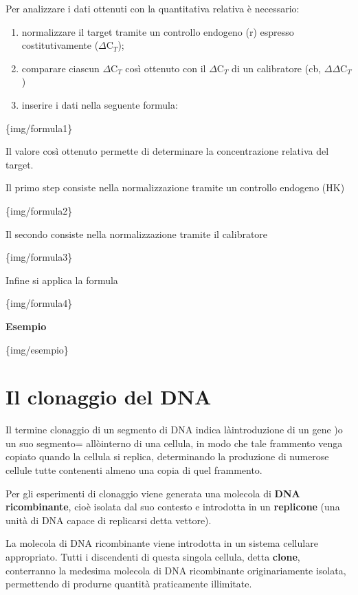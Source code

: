 \documentclass[11pt]{book}
\begin{document}
Per analizzare i dati ottenuti con la quantitativa relativa è
necessario:

\begin{enumerate}
\def\labelenumi{\arabic{enumi}.}
\itemsep1pt\parskip0pt
\item
  normalizzare il target tramite un controllo endogeno (r) espresso
  costitutivamente (\(\Delta\)C\(_T\));
\item
  comparare ciascun \(\Delta\)C\(_T\) così ottenuto con il
  \(\Delta\)C\(_T\) di un calibratore (cb, \(\Delta\)\(\Delta\)C\(_T\))
\item
  inserire i dati nella seguente formula:
\end{enumerate}

\{img/formula1\}

Il valore così ottenuto permette di determinare la concentrazione
relativa del target.

Il primo step consiste nella normalizzazione tramite un controllo
endogeno (HK)

\{img/formula2\}

Il secondo consiste nella normalizzazione tramite il calibratore

\{img/formula3\}

Infine si applica la formula

\{img/formula4\}

\textbf{Esempio}

\{img/esempio\}

\chapter{Il clonaggio del DNA}\label{il-clonaggio-del-dna}

Il termine clonaggio di un segmento di DNA indica làintroduzione di un
gene )o un suo segmento= allòinterno di una cellula, in modo che tale
frammento venga copiato quando la cellula si replica, determinando la
produzione di numerose cellule tutte contenenti almeno una copia di quel
frammento.

Per gli esperimenti di clonaggio viene generata una molecola di
\textbf{DNA ricombinante}, cioè isolata dal suo contesto e introdotta in
un \textbf{replicone} (una unità di DNA capace di replicarsi detta
vettore).

La molecola di DNA ricombinante viene introdotta in un sistema cellulare
appropriato. Tutti i discendenti di questa singola cellula, detta
\textbf{clone}, conterranno la medesima molecola di DNA ricombinante
originariamente isolata, permettendo di produrne quantità praticamente
illimitate.
\end{document}
